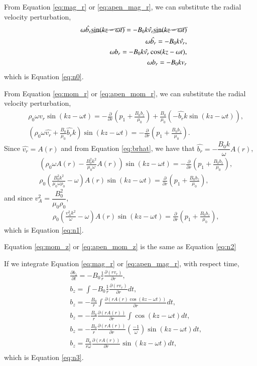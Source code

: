 From Equation \ref{eq:mag_r} or \ref{eq:apen_mag_r}, we can substitute the radial velocity perturbation,
\begin{align}
&&\omega \hat{b_r} \cancel{\sin(kz-\omega t)} = -B_0k\hat{v_r} \cancel{\sin(kz-\omega t)}\\
&&\omega \hat{b_r}= -B_0k\hat{v_r},\label{eq:brhat}\\
&&\omega b_r=-B_0k\hat{v_r}\cos(kz-\omega t),\\
&&\omega b_r=-B_0k{v_r}
\end{align}
which is Equation \ref{eq:n0}.

From Equation \ref{eq:mom_r} or \ref{eq:apen_mom_r}, we can substitute the radial velocity perturbation, 
\begin{align}
    &&\rho_0 \omega \hat{v_r} \sin(kz-\omega t) =-\frac{\partial}{\partial r}
    \left(p_1+\frac{B_0b_z}{\mu_0}\right)+\frac{B_0}{\mu_0}\left(-\hat{b_r}k\sin(kz-\omega t)\right),\\
    &&\left(\rho_0 \omega \hat{v_r} + \frac{B_0}{\mu_0}\hat{b_r}k \right)\sin(kz-\omega t) =-\frac{\partial}{\partial r}\left(p_1+\frac{B_0b_z}{\mu_0}\right).
\end{align}
Since $\hat{v_r} = A(r)$ and from Equation \ref{eq:brhat}, we have that $\hat{b_r} = -\dfrac{B_0 k}{\omega}A(r)$,
\begin{align}
&&\left(\rho_0 \omega A(r) - \frac{B_0^2 k^2}{\mu_0 \omega}A(r) \right)\sin(kz-\omega t) =-\frac{\partial}{\partial r}\left(p_1+\frac{B_0b_z}{\mu_0}\right),\\
&&\rho_0 \left(\frac{B_0^2 k^2}{\mu_0 \omega \rho_0} - \omega \right)A(r)\sin(kz-\omega t) =\frac{\partial}{\partial r}\left(p_1+\frac{B_0b_z}{\mu_0}\right),
\end{align}
and since $v_A^2 = \dfrac{B_0^2}{\mu_0\rho_0}$,
\begin{align}
&&\rho_0 \left(\frac{v_A^2 k^2}{\omega} - \omega \right)A(r)\sin(kz-\omega t) =\frac{\partial}{\partial r}\left(p_1+\frac{B_0b_z}{\mu_0}\right),
\end{align}
which is Equation \ref{eq:n1}.

Equation \ref{eq:mom_z} or \ref{eq:apen_mom_z} is the same as Equation \ref{eq:n2}

If we integrate Equation \ref{eq:mag_r} or \ref{eq:apen_mag_r}, with respect time,
\begin{align}
&&\frac{\partial b_z}{\partial t}=-B_0\frac{1}{r}\frac{\partial (rv_r)}{\partial r},\\
&& b_z = \int -B_0\frac{1}{r}\frac{\partial (rv_r)}{\partial r} dt,\\
&& b_z =  -\frac{B_0}{r}\int\frac{\partial (rA(r)\cos(kz-\omega t))}{\partial r} dt,\\
&& b_z =  -\frac{B_0}{r}\frac{\partial (rA(r))}{\partial r}\int \cos(kz-\omega t) dt,\\
&& b_z =  -\frac{B_0}{r}\frac{\partial (rA(r))}{\partial r}\left(\frac{-1}{\omega}\right) \sin(kz-\omega t) dt,\\
&& b_z =  \frac{B_0}{r\omega}\frac{\partial (rA(r))}{\partial r}\sin(kz-\omega t) dt,\\
\end{align}
which is Equation \ref{eq:n3}.


